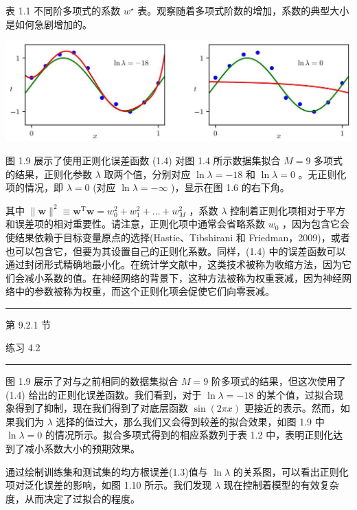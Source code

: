 \documentclass[10pt]{report}
\newcommand{\HRule}{\begin{center}\rule{0.9\linewidth}{0.2mm}\end{center}}
\begin{document}
表 1.1 不同阶多项式的系数 \({w}^{ \star  }\) 表。观察随着多项式阶数的增加，系数的典型大小是如何急剧增加的。

\begin{center}
\includegraphics[max width=1.0\textwidth]{images/0194e279-9b28-703a-88f4-c3ac21e2010d_32_240_344_1308_380_0.jpg}
\end{center}
\hspace*{3em} 

图 1.9 展示了使用正则化误差函数 (1.4) 对图 1.4 所示数据集拟合 \(M = 9\) 多项式的结果，正则化参数 \(\lambda\) 取两个值，分别对应 \(\ln \lambda  =  - {18}\) 和 \(\ln \lambda  = 0\) 。无正则化项的情况，即 \(\lambda  = 0\) (对应 \(\ln \lambda  =  - \infty\) )，显示在图 1.6 的右下角。

其中 \(\parallel \mathbf{w}{\parallel }^{2} \equiv  {\mathbf{w}}^{\mathrm{T}}\mathbf{w} = {w}_{0}^{2} + {w}_{1}^{2} + \ldots  + {w}_{M}^{2}\) ，系数 \(\lambda\) 控制着正则化项相对于平方和误差项的相对重要性。请注意，正则化项中通常会省略系数 \({w}_{0}\) ，因为包含它会使结果依赖于目标变量原点的选择(Hastie、Tibshirani 和 Friedman，2009)，或者也可以包含它，但要为其设置自己的正则化系数。同样，(1.4) 中的误差函数可以通过封闭形式精确地最小化。在统计学文献中，这类技术被称为收缩方法，因为它们会减小系数的值。在神经网络的背景下，这种方法被称为权重衰减，因为神经网络中的参数被称为权重，而这个正则化项会促使它们向零衰减。

\HRule

第 9.2.1 节

练习 4.2

\HRule

图 1.9 展示了对与之前相同的数据集拟合 \(M = 9\) 阶多项式的结果，但这次使用了 (1.4) 给出的正则化误差函数。我们看到，对于 \(\ln \lambda  =  - {18}\) 的某个值，过拟合现象得到了抑制，现在我们得到了对底层函数 \(\sin \left( {2\pi x}\right)\) 更接近的表示。然而，如果我们为 \(\lambda\) 选择的值过大，那么我们又会得到较差的拟合效果，如图 1.9 中 \(\ln \lambda  = 0\) 的情况所示。拟合多项式得到的相应系数列于表 1.2 中，表明正则化达到了减小系数大小的预期效果。

通过绘制训练集和测试集的均方根误差(1.3)值与 \(\ln \lambda\) 的关系图，可以看出正则化项对泛化误差的影响，如图 1.10 所示。我们发现 \(\lambda\) 现在控制着模型的有效复杂度，从而决定了过拟合的程度。
\end{document}
